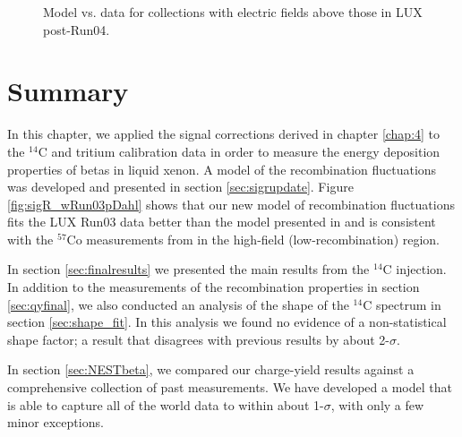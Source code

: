 \begin{figure}[!h]
\begin{subfigure}{0.5\linewidth}
\caption{}
\end{subfigure}
\caption{Model vs. data for collections with electric fields above those in LUX post-Run04.}
\label{fig:betamod_highfield}
\end{figure}

\clearpage
\section{Summary}
In this chapter, we applied the signal corrections derived in chapter \ref{chap:4} to the $^{14}$C and tritium calibration data in order to measure the energy deposition properties of betas in liquid xenon. A model of the recombination fluctuations was developed and presented in section \ref{sec:sigrupdate}. Figure \ref{fig:sigR_wRun03pDahl} shows that our new model of recombination fluctuations fits the LUX Run03 data better than the model presented in \cite{attila} and is consistent with the $^{57}$Co measurements from \cite{dahl} in the high-field (low-recombination) region. 

In section \ref{sec:finalresults} we presented the main results from the $^{14}$C injection. In addition to the measurements of the recombination properties in section \ref{sec:qyfinal}, we also conducted an analysis of the shape of the $^{14}$C spectrum in section \ref{sec:shape_fit}. In this analysis we found no evidence of a non-statistical shape factor; a result that disagrees with previous results by about 2-$\sigma$\cite{C14_Kuzminov}.

In section \ref{sec:NESTbeta}, we compared our charge-yield results against a comprehensive collection of past measurements. We have developed a model that is able to capture all of the world data to within about 1-$\sigma$, with only a few minor exceptions.



